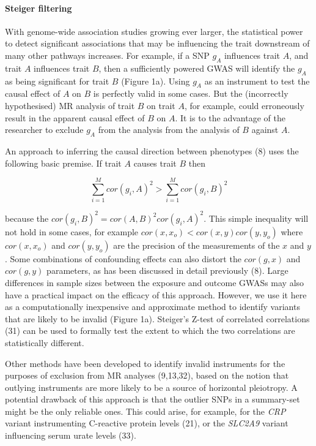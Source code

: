 \documentclass[]{article}
\let\oldparagraph\paragraph
\renewcommand{\paragraph}[1]{\oldparagraph{#1}\mbox{}}
\begin{document}
\paragraph{Steiger filtering}\label{steiger-filtering}

With genome-wide association studies growing ever larger, the
statistical power to detect significant associations that may be
influencing the trait downstream of many other pathways increases. For
example, if a SNP \(g_{A}\) influences trait \(A\), and trait \(A\)
influences trait \(B\), then a sufficiently powered GWAS will identify
the \(g_{A}\) as being significant for trait \(B\) (Figure 1a). Using
\(g_{A}\) as an instrument to test the causal effect of \(A\) on \(B\)
is perfectly valid in some cases. But the (incorrectly hypothesised) MR
analysis of trait \(B\) on trait \(A\), for example, could erroneously
result in the apparent causal effect of \(B\) on \(A\). It is to the
advantage of the researcher to exclude \(g_{A}\) from the analysis from
the analysis of \(B\) against \(A\).

An approach to inferring the causal direction between phenotypes (8)
uses the following basic premise. If trait \(A\) causes trait \(B\) then

\[
\sum^M_{i=1}{cor(g_{i}, A)^2} > \sum^M_{i=1}{cor(g_{i}, B)^2}
\]

because the \(cor(g_{i}, B)^2 = cor(A, B)^{2} cor(g_{i}, A)^{2}\). This
simple inequality will not hold in some cases, for example
\(cor(x, x_o) < cor(x,y)cor(y,y_o)\) where \(cor(x, x_o)\) and
\(cor(y, y_o)\) are the precision of the measurements of the \(x\) and
\(y\). Some combinations of confounding effects can also distort the
\(cor(g,x)\) and \(cor(g,y)\) parameters, as has been discussed in
detail previously (8). Large differences in sample sizes between the
exposure and outcome GWASs may also have a practical impact on the
efficacy of this approach. However, we use it here as a computationally
inexpensive and approximate method to identify variants that are likely
to be invalid (Figure 1a). Steiger's Z-test of correlated correlations
(31) can be used to formally test the extent to which the two
correlations are statistically different.

Other methods have been developed to identify invalid instruments for
the purposes of exclusion from MR analyses (9,13,32), based on the
notion that outlying instruments are more likely to be a source of
horizontal pleiotropy. A potential drawback of this approach is that the
outlier SNPs in a summary-set might be the only reliable ones. This
could arise, for example, for the \emph{CRP} variant instrumenting
C-reactive protein levels (21), or the \emph{SLC2A9} variant influencing
serum urate levels (33).
\end{document}

